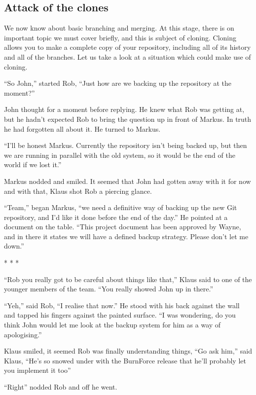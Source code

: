 \subsection{Attack of the clones}

We now know about basic branching and merging.  At this stage, there is on important topic we must cover briefly, and this is subject of cloning.  Cloning allows you to make a complete copy of your repository, including all of its history and all of the branches.  Let us take a look at a situation which could make use of cloning.

\begin{trenches}
``So John,'' started Rob, ``Just how are we backing up the repository at the moment?''

John thought for a moment before replying.  He knew what Rob was getting at, but he hadn't expected Rob to bring the question up in front of Markus.  In truth he had forgotten all about it.  He turned to Markus.

``I'll be honest Markus.  Currently the repository isn't being backed up, but then we are running in parallel with the old system, so it would be the end of the world if we lost it.''

Markus nodded and smiled.  It seemed that John had gotten away with it for now and with that, Klaus shot Rob a piercing glance.  

``Team,'' began Markus, ``we need a definitive way of backing up the new Git repository, and I'd like it done before the end of the day.''  He pointed at a document on the table.  ``This project document has been approved by Wayne, and in there it states we will have a defined backup strategy.  Please don't let me down.''

\begin{center} * * * \end{center}

``Rob you really got to be careful about things like that,'' Klaus said to one of the younger members of the team.  ``You really showed John up in there.''  

``Yeh,'' said Rob, ``I realise that now.''  He stood with his back against the wall and tapped his fingers against the painted surface.  ``I was wondering, do you think John would let me look at the backup system for him as a way of apologising.''

Klaus smiled, it seemed Rob was finally understanding things, ``Go ask him,'' said Klaus, ``He's so snowed under with the BurnForce release that he'll probably let you implement it too''

``Right'' nodded Rob and off he went.
\end{trenches}

